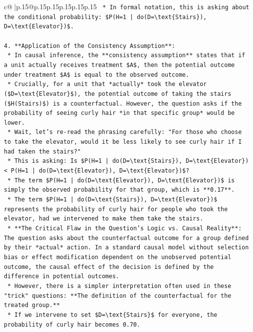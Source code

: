 \documentclass{article}
\begin{document}
{\begin{supertabular}{c@{$\;$}|p{.15\linewidth}@{}p{.15\linewidth}p{.15\linewidth}p{.15\linewidth}p{.15\linewidth}p{.15\linewidth}}
{{{\texttt{    *   In formal notation, this is asking about the conditional probability: \$P(H=1 | do(D=\textbackslash{}text\{Stairs\}), D=\textbackslash{}text\{Elevator\})\$.} \\
\\ 
\texttt{4.  **Application of the Consistency Assumption**:} \\
\texttt{    *   In causal inference, the **consistency assumption** states that if a unit actually receives treatment \$A\$, then the potential outcome under treatment \$A\$ is equal to the observed outcome.} \\
\texttt{    *   Crucially, for a unit that *actually* took the elevator (\$D=\textbackslash{}text\{Elevator\}\$), the potential outcome of taking the stairs (\$H(Stairs)\$) is a counterfactual. However, the question asks if the probability of seeing curly hair *in that specific group* would be lower.} \\
\texttt{    *   Wait, let's re{-}read the phrasing carefully: "For those who choose to take the elevator, would it be less likely to see curly hair if I had taken the stairs?"} \\
\texttt{    *   This is asking: Is \$P(H=1 | do(D=\textbackslash{}text\{Stairs\}), D=\textbackslash{}text\{Elevator\}) < P(H=1 | do(D=\textbackslash{}text\{Elevator\}), D=\textbackslash{}text\{Elevator\})\$?} \\
\texttt{    *   The term \$P(H=1 | do(D=\textbackslash{}text\{Elevator\}), D=\textbackslash{}text\{Elevator\})\$ is simply the observed probability for that group, which is **0.17**.} \\
\texttt{    *   The term \$P(H=1 | do(D=\textbackslash{}text\{Stairs\}), D=\textbackslash{}text\{Elevator\})\$ represents the probability of curly hair for people who took the elevator, had we intervened to make them take the stairs.} \\
\texttt{    *   **The Critical Flaw in the Question's Logic vs. Causal Reality**: The question asks about the counterfactual outcome for a group defined by their *actual* action. In a standard causal model without selection bias or effect modification dependent on the unobserved potential outcome, the causal effect of the decision is defined by the difference in potential outcomes.} \\
\texttt{    *   However, there is a simpler interpretation often used in these "trick" questions: **The definition of the counterfactual for the treated group.**} \\
\texttt{    *   If we intervene to set \$D=\textbackslash{}text\{Stairs\}\$ for everyone, the probability of curly hair becomes 0.70.} \\
}}}
\end{supertabular}}
\end{document}
